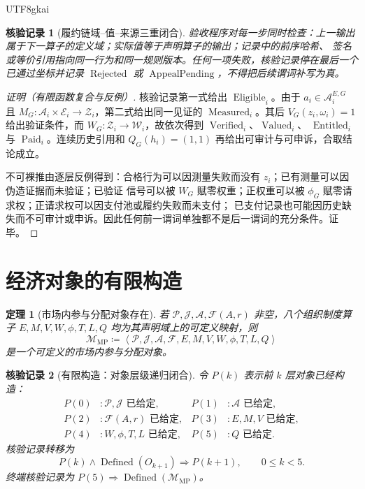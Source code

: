 \documentclass[12pt,a4paper,openany]{report}
\newtheorem{theorem}{定理}[chapter]
\newtheorem{Certificate}{核验记录}[chapter]
\newcommand{\Mech}{\mathcal M}
\newcommand{\Feas}{\mathcal F}
\newcommand{\Part}{\mathcal P}
\newcommand{\Act}{\mathcal A}
\newcommand{\Goods}{\mathcal J}
\newcommand{\DefEq}{\coloneqq}
\newcommand{\Tuple}[1]{\left\langle #1\right\rangle}
\DeclareMathOperator{\Eligible}{Eligible}
\DeclareMathOperator{\Measured}{Measured}
\DeclareMathOperator{\Verified}{Verified}
\DeclareMathOperator{\Valued}{Valued}
\DeclareMathOperator{\Entitled}{Entitled}
\DeclareMathOperator{\Paid}{Paid}
\begin{document}
\begin{CJK*}{UTF8}{gkai}
\begin{Certificate}[履约链域--值--来源三重闭合]
\label{cert:typed-atomic-execution-chain}
验收程序对每一步同时检查：上一输出属于下一算子的定义域；实际值等于声明算子的输出；记录中的前序哈希、
签名或等价引用指向同一行为和同一规则版本。任何一项失败，核验记录停在最后一个已通过坐标并记录
\(\operatorname{Rejected}\) 或 \(\operatorname{AppealPending}\)，不得把后续谓词补写为真。
\end{Certificate}

\begin{proof}[证明（有限函数复合与反例）]
核验记录第一式给出 \(\Eligible_i\)。由于 \(a_i\in\Act_i^{E,G}\) 且
\(M_G:\Act_i\times\mathcal E_i\to\mathcal Z_i\)，第二式给出同一见证的 \(\Measured_i\)。其后
\(V_G(z_i,\omega_i)=1\) 给出验证条件，而 \(W_G:\mathcal Z_i\to\mathcal W_i\)，故依次得到 \(\Verified_i\)、\(\Valued_i\)、
\(\Entitled_i\) 与 \(\Paid_i\)。连续历史引用和 \(Q_G(h_i)=(1,1)\) 再给出可审计与可申诉，合取结论成立。

不可裸推由逐层反例得到：合格行为可以因测量失败而没有 \(z_i\)；已有测量可以因伪造证据而未验证；已验证
信号可以被 \(W_G\) 赋零权重；正权重可以被 \(\phi_G\) 赋零请求权；正请求权可以因支付池或履约失败而未支付；
已支付记录也可能因历史缺失而不可审计或申诉。因此任何前一谓词单独都不是后一谓词的充分条件。证毕。
\end{proof}

\section{经济对象的有限构造}

\begin{theorem}[市场内参与分配对象存在]
\label{thm:governance-economy-object-exists}
若 \(\Part,\Goods,\Act,\Feas(A,r)\) 非空，八个组织制度算子
\(E,M,V,W,\phi,T,L,Q\) 均为其声明域上的可定义映射，则
\[
  \Mech_{\mathrm{MP}}
  \DefEq
  \Tuple{\Part,\Goods,\Act,\Feas,E,M,V,W,\phi,T,L,Q}
\]
是一个可定义的市场内参与分配对象。
\end{theorem}

\begin{Certificate}[有限构造：对象层级递归闭合]
\label{cert:governance-economy-object-exists}
令 \(P(k)\) 表示前 \(k\) 层对象已经构造：
\[
\begin{aligned}
P(0)&:\Part,\Goods\text{ 已给定},&
P(1)&:\Act\text{ 已给定},\\
P(2)&:\Feas(A,r)\text{ 已给定},&
P(3)&:E,M,V\text{ 已给定},\\
P(4)&:W,\phi,T,L\text{ 已给定},&
P(5)&:Q\text{ 已给定}.
\end{aligned}
\]
核验记录转移为
\[
  P(k)\wedge\operatorname{Defined}(O_{k+1})
  \Longrightarrow P(k+1),\qquad 0\le k<5.
\]
终端核验记录为 \(P(5)\Longrightarrow\operatorname{Defined}(\Mech_{\mathrm{MP}})\)。
\end{Certificate}


\end{CJK*}
\end{document}
